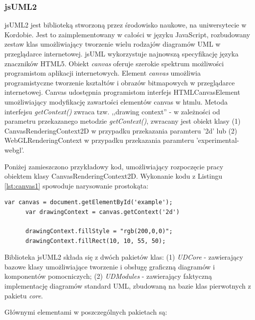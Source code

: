       \subsubsection{jsUML2}
        jsUML2 jest biblioteką stworzoną przez środowisko naukowe, na uniwersytecie w Kordobie. Jest to zaimplementowany w całości w języku JavaScript, rozbudowany zestaw klas umożliwiający tworzenie wielu rodzajów diagramów UML w przeglądarce internetowej. jsUML wykorzystuje najnowszą specyfikację języka znaczników HTML5. Obiekt \emph{canvas} oferuje szerokie spektrum możliwości programistom aplikacji internetowych. Element \emph{canvas} umożliwia programistyczne tworzenie kształtów i obrazów bitmapowych w przeglądarce internetowej. Canvas udostępnia programistom interfejs HTMLCanvasElement umożliwiający modyfikację zawartości elementów canvas w htmlu. Metoda interfejsu \emph{getContext()} zwraca tzw. ,,drawing context'' - w zależności od parametru przekazanego metodzie \emph{getContext()}, zwracany jest obiekt klasy (1) CanvasRenderingContext2D w przypadku przekazania paramteru '2d' lub (2) WebGLRenderingContext w przypadku przekazania paramteru 'experimental-webgl'.

        Poniżej zamieszczono przykładowy kod, umożliwiający rozpoczęcie pracy obiektem klasy CanvasRenderingContext2D. Wykonanie kodu z Listingu \ref{lst:canvas1} spowoduje narysowanie prostokąta:

      \begin{lstlisting}[caption={Przykład HTML5 canvas}, label={lst:canvas1}]
      var canvas = document.getElementById('example');
      var drawingContext = canvas.getContext('2d')

      drawingContext.fillStyle = "rgb(200,0,0)";  
      drawingContext.fillRect(10, 10, 55, 50);
      \end{lstlisting}

        Biblioteka jsUML2 składa się z dwóch pakietów klas: (1) \emph{UDCore} - zawierający bazowe klasy umożliwiające tworzenie i obsługę graficzną diagramów i komponentów pomocniczych; (2) \emph{UDModules} - zawierający faktyczną implementację diagramów standard UML, zbudowaną na bazie klas pierwotnych z pakietu \emph{core}.

        Głównymi elementami w poszczególnych pakietach są:

